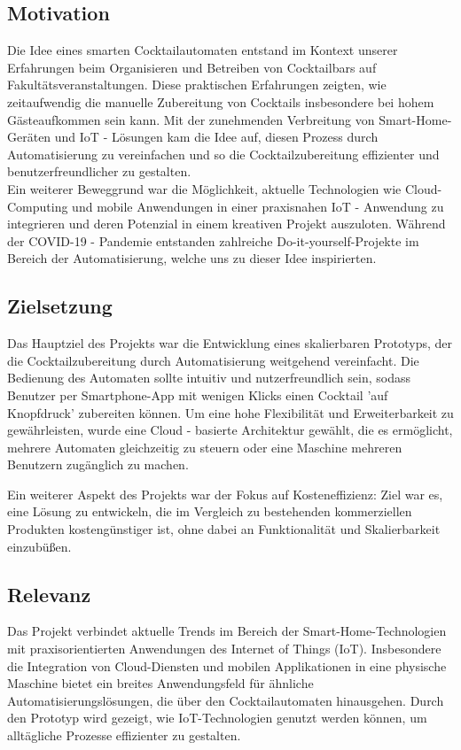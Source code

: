 \subsection{Motivation}
Die Idee eines smarten Cocktailautomaten entstand im Kontext unserer Erfahrungen beim Organisieren 
und Betreiben von Cocktailbars auf Fakultätsveranstaltungen. Diese praktischen Erfahrungen zeigten, 
wie zeitaufwendig die manuelle Zubereitung von Cocktails insbesondere bei hohem Gästeaufkommen sein 
kann. Mit der zunehmenden Verbreitung von Smart-Home-Geräten und IoT - Lösungen kam die Idee auf, 
diesen Prozess durch Automatisierung zu vereinfachen und so die Cocktailzubereitung effizienter und 
benutzerfreundlicher zu gestalten. 
\\
Ein weiterer Beweggrund war die Möglichkeit, aktuelle Technologien wie Cloud-Computing und mobile 
Anwendungen in einer praxisnahen IoT - Anwendung zu integrieren und deren Potenzial in einem kreativen 
Projekt auszuloten. Während der COVID-19 - Pandemie entstanden zahlreiche Do-it-yourself-Projekte im 
Bereich der Automatisierung, welche uns zu dieser Idee inspirierten.

\subsection{Zielsetzung}
Das Hauptziel des Projekts war die Entwicklung eines skalierbaren Prototyps, der die 
Cocktailzubereitung durch Automatisierung weitgehend vereinfacht. Die Bedienung des Automaten 
sollte intuitiv und nutzerfreundlich sein, sodass Benutzer per Smartphone-App mit wenigen Klicks 
einen Cocktail 'auf Knopfdruck' zubereiten können. Um eine hohe Flexibilität und Erweiterbarkeit 
zu gewährleisten, wurde eine Cloud - basierte Architektur gewählt, die es ermöglicht, mehrere 
Automaten gleichzeitig zu steuern oder eine Maschine mehreren Benutzern zugänglich zu machen. 

Ein weiterer Aspekt des Projekts war der Fokus auf Kosteneffizienz: Ziel war es, eine Lösung zu 
entwickeln, die im Vergleich zu bestehenden kommerziellen Produkten kostengünstiger ist, ohne dabei 
an Funktionalität und Skalierbarkeit einzubüßen.

\subsection{Relevanz}
Das Projekt verbindet aktuelle Trends im Bereich der Smart-Home-Technologien mit praxisorientierten 
Anwendungen des Internet of Things (IoT). Insbesondere die Integration von Cloud-Diensten und 
mobilen Applikationen in eine physische Maschine bietet ein breites Anwendungsfeld für ähnliche 
Automatisierungslösungen, die über den Cocktailautomaten hinausgehen. Durch den Prototyp wird 
gezeigt, wie IoT-Technologien genutzt werden können, um alltägliche Prozesse effizienter zu 
gestalten. 

